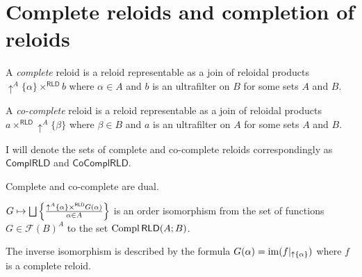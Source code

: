 \section{Complete reloids and completion of reloids}
\begin{defn}
A \emph{complete} reloid is a reloid representable
as a join of reloidal products $\uparrow^{A}\{\alpha\}\times^{\mathsf{RLD}}b$
where $\alpha\in A$ and $b$ is an ultrafilter on $B$ for some sets
$A$ and $B$.
\end{defn}

\begin{defn}
A \emph{co-complete} reloid is a reloid
representable as a join of reloidal products $a\times^{\mathsf{RLD}}\uparrow^{A}\{\beta\}$
where $\beta\in B$ and $a$ is an ultrafilter on $A$ for some sets
$A$ and $B$.
\end{defn}
I will denote the sets of complete and co-complete reloids correspondingly
as $\mathsf{ComplRLD}$ and $\mathsf{CoComplRLD}$.
\begin{obvious}
Complete and co-complete are dual.\end{obvious}
\begin{thm}
\label{complrld-rep}$G\mapsto\bigsqcup\left\{ \frac{\uparrow^{A}\{\alpha\}\times^{\mathsf{RLD}}G(\alpha)}{\alpha\in A}\right\}$
is an order isomorphism from the set of functions $G\in\mathscr{F}(B)^{A}$
to the set $\operatorname{Compl}\mathsf{RLD}(A;B)$.

The inverse isomorphism is described by the formula $G(\alpha)=\operatorname{im}(f|_{\uparrow \{\alpha\}})$
where $f$ is a complete reloid.\end{thm}
